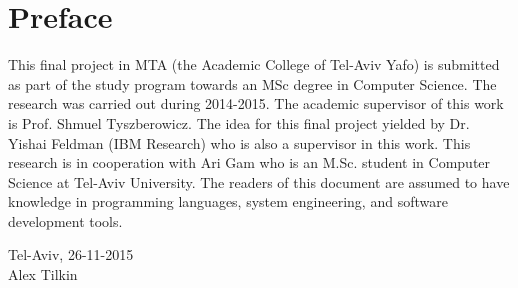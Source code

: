 \section*{Preface}
This final project in MTA (the Academic College of Tel-Aviv Yafo) is submitted as part of the study program towards an MSc degree in Computer Science. The research was carried out during 2014-2015. The academic supervisor of this work is Prof. Shmuel Tyszberowicz. The idea for this final project yielded by Dr. Yishai Feldman (IBM Research) who is also a supervisor in this work. This research is in cooperation with Ari Gam who is an M.Sc. student in Computer Science at Tel-Aviv University. The readers of this document are assumed to have knowledge in programming languages, system engineering, and software development tools.\\[2cm]

\begin{center}
Tel-Aviv, 26-11-2015\\[1pc]
Alex Tilkin
\end{center}